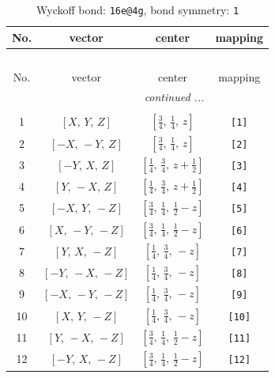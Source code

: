 \documentclass[fleqn,8pt]{jsarticle}
\begin{document}
\begin{longtable}{cccc}
\caption{Wyckoff bond: {\tt 16e@4g}, bond symmetry: {\tt 1}}
 \\
 \hline \hline
No. & vector & center & mapping \\ \hline \endfirsthead

\multicolumn{3}{l}{\tablename\ \thetable{}} \\
 \hline \hline
No. & vector & center & mapping \\ \hline \endhead

 \hline \hline
\multicolumn{3}{r}{\footnotesize\it continued ...} \\ \endfoot

 \hline \hline
\multicolumn{3}{r}{} \\ \endlastfoot

1 & $\left[ X,\, Y,\, Z \right]$ & $\left[ \frac{3}{4},\, \frac{1}{4},\, z \right]$ & {\tt [1]} \\ \hline
2 & $\left[ - X,\, - Y,\, Z \right]$ & $\left[ \frac{3}{4},\, \frac{1}{4},\, z \right]$ & {\tt [2]} \\ \hline
3 & $\left[ - Y,\, X,\, Z \right]$ & $\left[ \frac{1}{4},\, \frac{3}{4},\, z + \frac{1}{2} \right]$ & {\tt [3]} \\ \hline
4 & $\left[ Y,\, - X,\, Z \right]$ & $\left[ \frac{1}{4},\, \frac{3}{4},\, z + \frac{1}{2} \right]$ & {\tt [4]} \\ \hline
5 & $\left[ - X,\, Y,\, - Z \right]$ & $\left[ \frac{3}{4},\, \frac{1}{4},\, \frac{1}{2} - z \right]$ & {\tt [5]} \\ \hline
6 & $\left[ X,\, - Y,\, - Z \right]$ & $\left[ \frac{3}{4},\, \frac{1}{4},\, \frac{1}{2} - z \right]$ & {\tt [6]} \\ \hline
7 & $\left[ Y,\, X,\, - Z \right]$ & $\left[ \frac{1}{4},\, \frac{3}{4},\, - z \right]$ & {\tt [7]} \\ \hline
8 & $\left[ - Y,\, - X,\, - Z \right]$ & $\left[ \frac{1}{4},\, \frac{3}{4},\, - z \right]$ & {\tt [8]} \\ \hline
9 & $\left[ - X,\, - Y,\, - Z \right]$ & $\left[ \frac{1}{4},\, \frac{3}{4},\, - z \right]$ & {\tt [9]} \\ \hline
10 & $\left[ X,\, Y,\, - Z \right]$ & $\left[ \frac{1}{4},\, \frac{3}{4},\, - z \right]$ & {\tt [10]} \\ \hline
11 & $\left[ Y,\, - X,\, - Z \right]$ & $\left[ \frac{3}{4},\, \frac{1}{4},\, \frac{1}{2} - z \right]$ & {\tt [11]} \\ \hline
12 & $\left[ - Y,\, X,\, - Z \right]$ & $\left[ \frac{3}{4},\, \frac{1}{4},\, \frac{1}{2} - z \right]$ & {\tt [12]} \\ \hline

\end{longtable}
\end{document}
